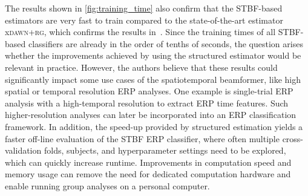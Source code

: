 \begin{refsection}
	The results shown in \autoref{fig:training_time} also confirm that the
	STBF-based estimators are very fast to train compared to the
	state-of-the-art estimator x\textsc{dawn+rg}, which confirms the results in~\cite{Wittevrongel2016}.
	Since the training times of all STBF-based classifiers are already in
	the order of tenths of seconds, the question arises whether the
	improvements achieved by using the structured estimator would be relevant in
	practice.
	However, the authors believe that these results could significantly impact some
	use cases of the spatiotemporal beamformer, like high spatial or temporal resolution ERP analyses.
	One example is single-trial ERP analysis with a high-temporal
	resolution to extract ERP time features.
	Such higher-resolution analyses can later be incorporated into an ERP
	classification framework.
	In addition, the speed-up provided by structured estimation yields a faster
	off-line evaluation of the STBF ERP classifier, where often multiple cross-validation folds, subjects, and hyperparameter settings need to be explored, which can quickly increase runtime.
	Improvements in computation speed and memory usage can remove the need for dedicated computation hardware and enable running group analyses on a personal computer.


\end{refsection}
